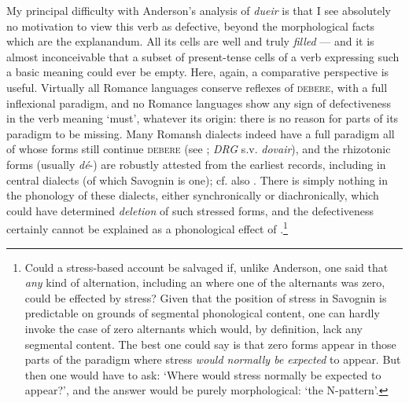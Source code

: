 \documentclass[output=paper,
modfonts
]{LSP/langsci}
\begin{document}
My principal difficulty with Anderson's analysis of \emph{dueir} is that
I see absolutely no motivation to view this verb as defective, beyond
the morphological facts which are the explanandum. All its cells are
well and truly \emph{filled} --- and it is almost inconceivable that a
subset of present-tense cells of a verb expressing such a basic meaning
could ever be empty. Here, again, a comparative perspective is useful.
Virtually all Romance languages conserve reflexes of \textsc{debere},
with a full inflexional paradigm, and no Romance languages show any sign
of defectiveness in the verb meaning `must', whatever its origin: there
is no reason for parts of its paradigm to be missing. Many Romansh
dialects indeed have a full paradigm all of whose forms still continue
\textsc{debere} (see \citealt[152f.]{decurtins1958a}; \emph{DRG} s.v.
\emph{dovair}), and the rhizotonic forms (usually \emph{dé}-) are
robustly attested from the earliest records, including in central
dialects (of which Savognin is one); cf. also \citet[30;32]{anderson2010a}.
There is simply nothing in the phonology of these dialects, either
synchronically or diachronically, which could have determined
\emph{deletion} of such stressed forms, and the defectiveness certainly
cannot be explained as a phonological effect of .\footnote{Could a
  stress-based account be salvaged if, unlike Anderson, one said that
  \emph{any} kind of alternation, including an  where one of
  the alternants was zero, could be effected by stress? Given that the
  position of stress in Savognin is predictable on grounds of segmental
  phonological content, one can hardly invoke the case of zero
  alternants which would, by definition, lack any segmental content. The
  best one could say is that zero forms appear in those parts of the
  paradigm where stress \emph{would normally be expected} to appear. But
  then one would have to ask: `Where would stress normally be expected
  to appear?', and the answer would be purely morphological: `the
  N-pattern'.}
\end{document}
